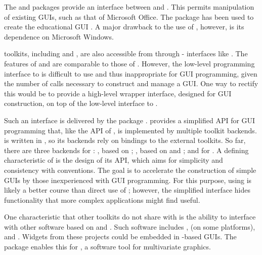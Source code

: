 \documentclass[article]{jss}
\begin{document}
The  \citep{RDCOM} and  \citep{RDCOM2} packages provide
an interface between  and  \citep{DCOM}. This permits
manipulation of existing GUIs, such as that of Microsoft Office. The 
package has been used to create the educational  GUI 
\citep{simpleR}. A major drawback to the use of , however, is
its dependence on Microsoft Windows.

 toolkits, including  and , are also accessible
from  through - interfaces like  
\citep{rJava}. The features
of  and  are comparable to those of .
However, the low-level programming interface to  
is difficult to use and thus inappropriate for GUI programming, given the
number of calls necessary to construct and manage a GUI. One way to rectify
this would be to provide a high-level wrapper interface, designed for GUI
construction, on top of the low-level interface to .

Such an interface is delivered by the  package
\citep{gWidgets}.  provides a simplified API for GUI programming
that, like the API of , is implemented by multiple toolkit 
backends.  is written in , so its backends rely on 
bindings to the external toolkits. So far, there are three backends for 
: , based on ; ,
based on  and ; and  for .
A defining characteristic of  is the
design of its API, which aims for simplicity and consistency with 
conventions.  The goal is to accelerate the construction of simple 
GUIs by those inexperienced with GUI programming. For this purpose, using 
 is likely a better course than direct use of ; however,
the simplified interface hides functionality that more complex applications
might find useful.

One characteristic that other toolkits do not share with  is the 
ability to interface with other software based on  and .
Such software includes ,  (on some platforms), 
and . Widgets from these projects could be embedded in 
-based GUIs. The 
package enables this for , a software tool for multivariate graphics. 
\end{document}
